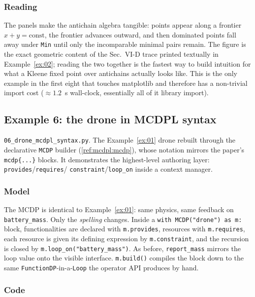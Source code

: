 \documentclass[11pt,a4paper]{article}
\begin{document}
\subsubsection*{Reading}

The panels make the antichain algebra tangible: points appear along a
frontier $x+y=\text{const}$, the frontier advances outward, and then
dominated points fall away under \texttt{Min} until only the incomparable
minimal pairs remain. The figure is the exact geometric content of the
Sec.\ VI-D trace printed textually in Example~\ref{ex:02}; reading the two
together is the fastest way to build intuition for what a Kleene fixed
point over antichains actually looks like. This is the only example in the
first eight that touches matplotlib and therefore has a non-trivial import
cost ($\approx 1.2$~s wall-clock, essentially all of it library import).

\subsection{Example 6: the drone in MCDPL syntax}\label{ex:06}

\texttt{06\_drone\_mcdpl\_syntax.py}. The Example~\ref{ex:01} drone rebuilt
through the declarative \texttt{MCDP} builder (\ref{ref:mcdpl:mcdp}), whose
notation mirrors the paper's \texttt{mcdp\{...\}} blocks. It demonstrates
the highest-level authoring layer: \texttt{provides}/\texttt{requires}/
\texttt{constraint}/\texttt{loop\_on} inside a context manager.

\subsubsection*{Model}

The MCDP is identical to Example~\ref{ex:01}: same physics, same feedback
on \texttt{battery\_mass}. Only the \emph{spelling} changes. Inside a
\texttt{with MCDP("drone") as m:} block, functionalities are declared with
\texttt{m.provides}, resources with \texttt{m.requires}, each resource is
given its defining expression by \texttt{m.constraint}, and the recursion
is closed by \texttt{m.loop\_on("battery\_mass")}. As before,
\texttt{report\_mass} mirrors the loop value onto the visible interface.
\texttt{m.build()} compiles the block down to the same
\texttt{FunctionDP}-in-a-\texttt{Loop} the operator API produces by hand.

\subsubsection*{Code}
\end{document}
